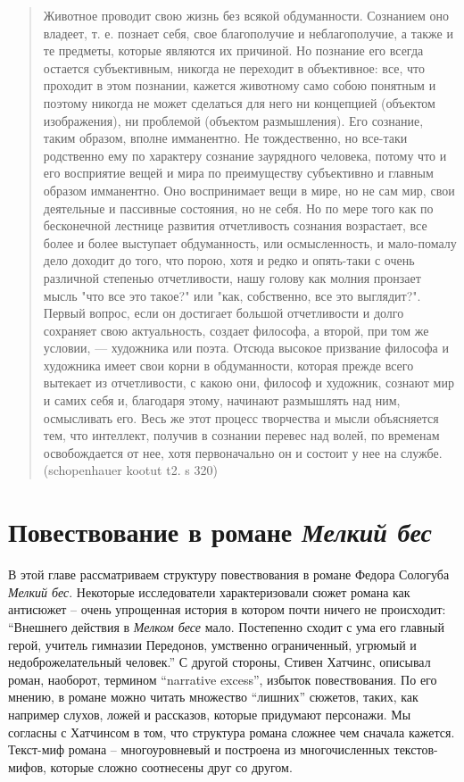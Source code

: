 \documentclass[12pt,a4paper]{article}
\begin{document}
\begin{quote}
Животное проводит свою жизнь без всякой обдуманности. Сознанием оно
владеет, т. е. познает себя, свое благополучие и неблагополучие, а также
и те предметы, которые являются их причиной. Но познание его всегда
остается субъективным, никогда не переходит в объективное: все, что
проходит в этом познании, кажется животному само собою понятным
и поэтому никогда не может сделаться для него ни концепцией (объектом
изображения), ни проблемой (объектом размышления). Его сознание,
таким образом, вполне имманентно. Не тождественно, но все-таки
родственно ему по характеру сознание заурядного человека, потому что и его
восприятие вещей и мира по преимуществу субъективно и главным
образом имманентно. Оно воспринимает вещи в мире, но не сам мир, свои
деятельные и пассивные состояния, но не себя. Но по мере того как по
бесконечной лестнице развития отчетливость сознания возрастает, все
более и более выступает обдуманность, или осмысленность, и
мало-помалу дело доходит до того, что порою, хотя и редко и опять-таки
с очень различной степенью отчетливости, нашу голову как молния
пронзает мысль "что все это такое?" или "как, собственно, все это
выглядит?". Первый вопрос, если он достигает большой отчетливости
и долго сохраняет свою актуальность, создает философа, а второй, при
том же условии, — художника или поэта. Отсюда высокое призвание
философа и художника имеет свои корни в обдуманности, которая прежде
всего вытекает из отчетливости, с какою они, философ и художник,
сознают мир и самих себя и, благодаря этому, начинают размышлять над
ним, осмысливать его. Весь же этот процесс творчества и мысли
объясняется тем, что интеллект, получив в сознании перевес над волей, по временам
освобождается от нее, хотя первоначально он и состоит у нее на службе.
(schopenhauer kootut t2. s 320)
\end{quote}

\section{Повествование в романе \textit{Мелкий бес}}

В этой главе рассматриваем структуру повествования в романе Федора Сологуба \emph{Мелкий бес}. Некоторые исследователи характеризовали сюжет романа как антисюжет -- очень упрощенная история в котором почти ничего не происходит:
\enquote{Внешнего действия в \emph{Мелком бесе} мало. Постепенно сходит с ума его главный герой, учитель гимназии Передонов, умственно ограниченный, угрюмый и недоброжелательный человек.}
\autocite[432.]{grigorjev1983} С другой стороны, Стивен Хатчинс, описывал роман, наоборот, термином \enquote{narrative excess}, избыток повествования. По его мнению, в романе можно читать множество \enquote{лишних} сюжетов, таких, как например слухов, ложей и рассказов, которые придумают персонажи. \parencite[111--114.]{hutchings1997} Мы согласны с Хатчинсом в том, что структура романа сложнее чем сначала кажется. Текст-миф романа – многоуровневый и построена из многочисленных текстов-мифов, которые сложно соотнесены друг со другом.
\end{document}
